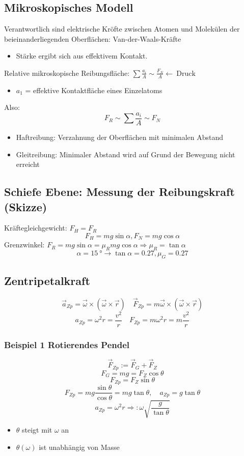 \documentclass[a4paper]{scrartcl}
\renewcommand{\v}[1]{\vec{#1}}
\theoremstyle{definition}
\theoremstyle{plain}
\theoremstyle{plain}
\theoremstyle{remark}
\theoremstyle{remark}
\theoremstyle{remark}
\begin{document}
\subsection{Mikroskopisches Modell}
\label{sec-3-9}
Verantwortlich sind elektrische Kröfte zwischen Atomen und Molekülen der beieinanderliegenden Oberflächen: Van-der-Waals-Kräfte
\begin{itemize}
\item Stärke ergibt sich aus effektivem Kontakt.
\end{itemize}
Relative mikroskopische Reibungsfläche: $\sum \frac{a_i}{A} \sim \frac{F_N}{A} \leftarrow~\text{Druck}$
\begin{itemize}
\item $a_1$ = effektive Kontaktfläche eines Einzelatoms
\end{itemize}
Also: \[F_R \sim \sum \frac{a_i}{A} \sim F_N\]
\begin{itemize}
\item Haftreibung: Verzahnung der Oberflächen mit minimalen Abstand
\item Gleitreibung: Minimaler Abstand wird auf Grund der Bewegung nicht erreicht
\end{itemize}
\subsection{Schiefe Ebene: Messung der Reibungskraft (Skizze)}
\label{sec-3-10}
Kräftegleichgewicht: $F_H = F_R$
\[F_H = m g \sin{\alpha}, F_N = m g \cos{\alpha}\]
Grenzwinkel: $F_R = m g \sin{\alpha} = \mu_R m g \cos{\alpha} \Rightarrow \mu_R = \tan{\alpha}$
\[\alpha = \SI{15}{\degree} \rightarrow \tan{\alpha} = 0.27,\mu_G = 0.27\]
\subsection{Zentripetalkraft}
\label{sec-3-11}
\[\v a_{Zp} = \v \omega \times(\v\omega\times\v r)\quad \v{F}_{Zp} = m\v\omega\times(\v\omega\times\v r)\]
\[a_{Zp} = \omega^2 r = \frac{v^2}{r}\quad F_{Zp} = m\omega^2 r = m \frac{v^2}{r}\]
\subsubsection{Beispiel 1 Rotierendes Pendel}
\label{sec-3-11-1}
\[\v{F}_{Zp} := \v{F}_G + \v{F}_Z\]
\[F_G = m g = F_Z \cos{\theta}\]
\[F_{Zp} = F_Z \sin{\theta}\]
\[F_{Zp} = mg \frac{\sin{\theta}}{\cos{\theta}} = m g \tan{\theta},\quad a_{Zp} = g\tan{\theta}\]
\[a_{Zp} = \omega^2 r \Rightarrow: \omega \sqrt{\frac{g}{\tan{\theta}}}\]
\begin{itemize}
\item $\theta$ steigt mit $\omega$ an
\item $\theta(\omega)$ ist unabhängig von Masse
\end{itemize}
\end{document}
